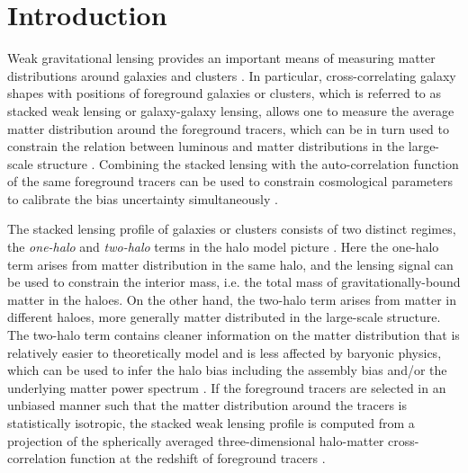 \documentclass[a4paper,fleqn,usenatbib]{mnras}
\begin{document}
\section{Introduction}
\label{sec:introduction}
Weak gravitational lensing provides an important means of measuring
matter distributions around galaxies and clusters
\citep[e.g.,][for a review]{Bartelmann2001}.
In particular, cross-correlating galaxy shapes with positions of foreground
galaxies or clusters, which is referred to as stacked weak lensing or galaxy-galaxy
lensing, allows one to measure the average matter distribution
around the foreground tracers, which can be in turn used to
constrain the relation between luminous and matter distributions
in the large-scale structure
\citep[e.g.,][]{Brainerd1996,Sheldon2004A,Mandelbaum2006,Okabeetal:10,
Leauthaud2012,Okabe2013,Umetsu2014,Miyatake2015,Murata2018,Prat2017}.
Combining the stacked lensing with the auto-correlation function of the same
foreground tracers can be used to constrain cosmological parameters
to calibrate the bias uncertainty simultaneously
\citep[e.g.,][]{Baldauf2010,OguriTakada:11,More2015}.

The stacked lensing profile of galaxies or clusters
consists of two distinct regimes, the {\it one-halo} and
{\it two-halo} terms in the halo model picture \citep[e.g.,][for a review]{Cooray2002}.
Here the one-halo term arises from matter distribution
in the same halo, and the lensing signal can be used to constrain
the interior mass, i.e. the total
mass of gravitationally-bound matter in the haloes.
On the other hand, the two-halo term arises from matter in different haloes, more generally
matter distributed in the large-scale structure. The two-halo term contains
cleaner information on the matter distribution that is relatively easier to theoretically
model and is less affected by baryonic physics, which can be used to infer the halo bias
including the assembly bias
\citep[e.g.,][]{Covone2014,Lin2016,Miyatake2016,More2016,Dvornik2017,Busch2017}
and/or the underlying matter power spectrum
\citep[e.g.,][]{Lombriser2012,Mandelbaum2013,Sereno2015,More2015,vanUitert2017b,DES2017}.
If the foreground tracers are
selected in an unbiased manner such that the matter distribution
around the tracers is statistically isotropic,
the stacked weak lensing profile is computed from a
projection of the spherically averaged three-dimensional
halo-matter cross-correlation function at the redshift of foreground tracers
\citep{Mandelbaum2005,Hikageetal:13,More2015}.
\end{document}
